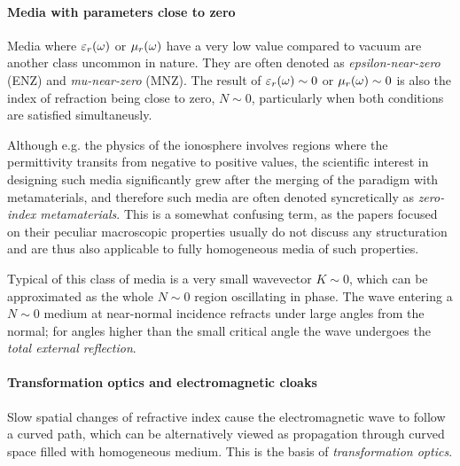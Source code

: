 \paragraph{Media with parameters close to zero}%
Media where $\varepsilon_r(\omega)$ or $\mu_r(\omega)$ have a very low value compared to vacuum are another class uncommon in nature. They are often denoted as \textit{epsilon-near-zero} (ENZ) and \textit{mu-near-zero} (MNZ).
The result of $\varepsilon_r(\omega)\sim 0$ or $\mu_r(\omega)\sim 0$ is also the index of refraction being close to zero, $N\sim 0$, particularly when both conditions are satisfied simultaneusly. 

Although e.g. the physics of the ionosphere involves regions where the permittivity transits from negative to positive values, the scientific interest in designing such media significantly grew
after the merging of the paradigm with metamaterials, and therefore such media are often denoted syncretically as \textit{zero-index metamaterials}. This is a somewhat confusing term, as the papers focused on their peculiar macroscopic properties \cite{basharin2013epsilon} 
usually do not discuss any structuration and are thus also applicable to fully homogeneous media of such properties.

Typical of this class of media is a very small wavevector $K\sim 0$, which can be approximated as the whole $N\sim 0$ region oscillating in phase. The wave entering a $N\sim 0$ medium at near-normal incidence refracts under large angles from the normal; for angles higher than the small critical angle the wave undergoes the \textit{total external reflection}. 


\paragraph{Transformation optics and electromagnetic cloaks}%
Slow spatial changes of refractive index cause the electromagnetic wave to follow a curved path, which can be alternatively viewed as propagation through curved space filled with homogeneous medium. This is the basis of \textit{transformation optics}.


